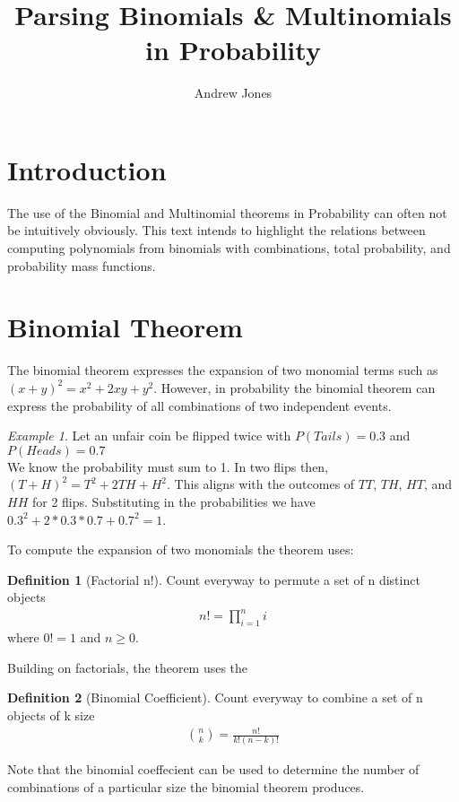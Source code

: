 \documentclass{article}
\title{Parsing Binomials \& Multinomials in Probability}
\author{Andrew Jones}\date{}
\theoremstyle{plain}
\theoremstyle{definition}
\newtheorem{definition}{Definition}
\theoremstyle{remark}
\newtheorem{example}{Example}
\begin{document}
\maketitle



\section*{Introduction}

The use of the Binomial and Multinomial theorems in Probability can often not be intuitively obviously. This text intends to highlight the relations between computing polynomials from binomials with combinations, total probability, and probability mass functions.


\section{Binomial Theorem}
The binomial theorem expresses the expansion of two monomial terms such as $(x + y)^2 = x^2 + 2xy + y^2$. However, in probability the binomial theorem can express the probability of all combinations of two independent events.
\begin{example}
  Let an unfair coin be flipped twice with $P(Tails) = 0.3$ and $P(Heads) = 0.7$ \\
  We know the probability must sum to 1. In two flips then, $(T + H)^2 = T^2 + 2TH + H^2$. This aligns with the outcomes of $TT$, $TH$, $HT$, and $HH$ for 2 flips. Substituting in the probabilities we have $0.3^2 + 2*0.3*0.7 + 0.7^2 = 1$.
\end{example}
To compute the expansion of two monomials the theorem uses:
\begin{definition}[Factorial n!]
  Count everyway to permute a set of n distinct objects
  \begin{align*}
    n! = {\displaystyle\prod_{i=1}^{n}i}
  \end{align*}
  where $0! = 1$ and $n \geq 0$.
\end{definition}
Building on factorials, the theorem uses the
\begin{definition}[Binomial Coefficient]
  Count everyway to combine a set of n objects of k size
  \begin{align*}
    \binom{n}{k} = \frac{n!}{k!(n-k)!}
  \end{align*}
\end{definition}
Note that the binomial coeffecient can be used to determine the number of combinations of a particular size the binomial theorem produces.
\end{document}
